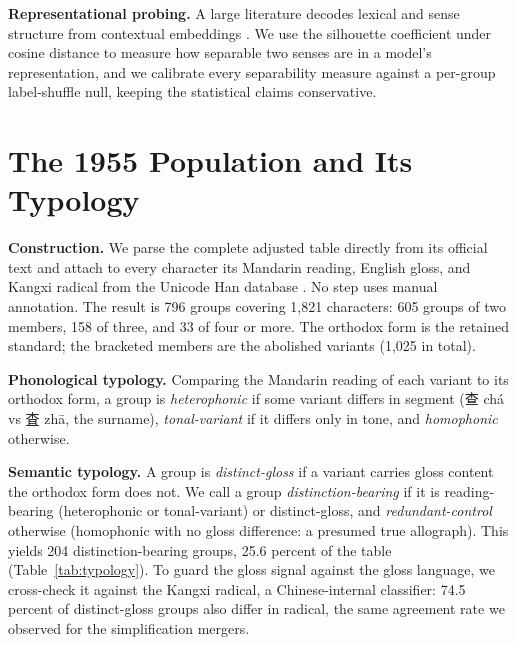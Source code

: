 \documentclass[10pt,twocolumn]{article}
\begin{document}
\noindent\textbf{Representational probing.} A large literature decodes lexical
and sense structure from contextual embeddings \cite{tenney2019,hewitt2019}. We
use the silhouette coefficient \cite{rousseeuw1987} under cosine distance to
measure how separable two senses are in a model's representation, and we
calibrate every separability measure against a per-group label-shuffle null,
keeping the statistical claims conservative.

\section{The 1955 Population and Its Typology}
\noindent\textbf{Construction.} We parse the complete adjusted table directly
from its official text and attach to every character its Mandarin reading,
English gloss, and Kangxi radical from the Unicode Han database \cite{unihan}. No
step uses manual annotation. The result is 796 groups covering 1,821 characters:
605 groups of two members, 158 of three, and 33 of four or more. The orthodox
form is the retained standard; the bracketed members are the abolished variants
(1,025 in total).

\noindent\textbf{Phonological typology.} Comparing the Mandarin reading of each
variant to its orthodox form, a group is \emph{heterophonic} if some variant
differs in segment (查 ch\'a vs 査 zh\=a, the surname), \emph{tonal-variant} if it
differs only in tone, and \emph{homophonic} otherwise.

\noindent\textbf{Semantic typology.} A group is \emph{distinct-gloss} if a
variant carries gloss content the orthodox form does not. We call a group
\emph{distinction-bearing} if it is reading-bearing (heterophonic or
tonal-variant) or distinct-gloss, and \emph{redundant-control} otherwise
(homophonic with no gloss difference: a presumed true allograph). This yields 204
distinction-bearing groups, 25.6 percent of the table (Table~\ref{tab:typology}).
To guard the gloss signal against the gloss language, we cross-check it against
the Kangxi radical, a Chinese-internal classifier: 74.5 percent of distinct-gloss
groups also differ in radical, the same agreement rate we observed for the
simplification mergers.
\end{document}
